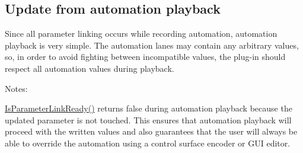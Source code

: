  \hypertarget{a00355_linkedParameters_sequences_automation}{}\subsection{Update from automation playback}\label{a00355_linkedParameters_sequences_automation}
Since all parameter linking occurs while recording automation, automation playback is very simple. The automation lanes may contain any arbitrary values, so, in order to avoid fighting between incompatible values, the plug-\/in should respect all automation values during playback.

Notes\+:
\begin{DoxyEnumerate}
\item \hyperlink{a00018_ae105f2a8a00facc2a190ef3ea86c5328}{Is\+Parameter\+Link\+Ready()} returns {\ttfamily false} during automation playback because the updated parameter is not touched. This ensures that automation playback will proceed with the written values and also guarantees that the user will always be able to override the automation using a control surface encoder or G\+U\+I editor.
\end{DoxyEnumerate}


